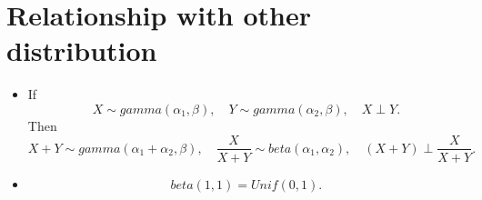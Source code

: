 \documentclass[a4paper,12pt]{article}
\begin{document}
\section{Relationship with other distribution}
\label{sec:relat-other-distr}

\begin{itemize}
\item If
  \[
    X \sim gamma\left(\alpha_1, \beta\right)
    ,\quad
    Y \sim gamma\left(\alpha_2, \beta\right)
    ,\quad
    X \perp Y
    .
  \]
  Then
  \[
    X + Y \sim gamma\left(\alpha_1 + \alpha_2, \beta\right)
    ,\quad
    \frac{X}{X + Y} \sim beta\left(\alpha_1, \alpha_2\right)
    ,\quad
    \left(X + Y\right) \perp \frac{X}{X + Y}
    .
  \]
\item
  \[
    beta\left(1, 1\right) = Unif\left(0, 1\right)
    .
  \]
\end{itemize}



\end{document}
